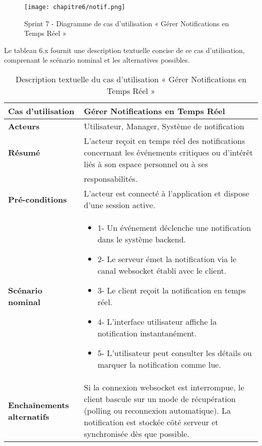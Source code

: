 \begin{figure}[H]
\centering
\texttt{[image: chapitre6/notif.png]}
\caption{Sprint 7 - Diagramme de cas d’utilisation « Gérer Notifications en Temps Réel »}
\end{figure}

Le tableau 6.x fournit une description textuelle concise de ce cas d’utilisation, comprenant le scénario nominal et les alternatives possibles.

\begin{longtable}{|>{\arraybackslash}p{4cm}|>{\arraybackslash}p{12cm}|}
\caption{\centering Description textuelle du cas d'utilisation « Gérer Notifications en Temps Réel »}
\label{tab:uc_notifications} \\
\hline
\rowcolor{gray!30}
\textbf{Cas d'utilisation} & Gérer Notifications en Temps Réel \\
\hline
\endfirsthead

\hline
\endhead

\hline
\endfoot

\hline \hline
\endlastfoot

\textbf{Acteurs} & Utilisateur, Manager, Système de notification \\
\hline
\textbf{Résumé} &
L’acteur reçoit en temps réel des notifications concernant les événements critiques ou d’intérêt liés à son espace personnel ou à ses  \\
\hline
\textbf{}&responsabilités.\\
\hline
\textbf{Pré-conditions} &
L’acteur est connecté à l’application et dispose d’une session active. \\
\hline
\textbf{Scénario nominal} &
\begin{itemize}[label=]
 \item{1-} Un événement déclenche une notification dans le système backend.
 \item{2-} Le serveur émet la notification via le canal websocket établi avec le client.
 \item{3-} Le client reçoit la notification en temps réel.
 \item{4-} L’interface utilisateur affiche la notification instantanément.
 \item{5-} L’utilisateur peut consulter les détails ou marquer la notification comme lue.
\end{itemize} \\
\hline
\textbf{Enchaînements alternatifs} &
Si la connexion websocket est interrompue, le client bascule sur un mode de récupération (polling ou reconnexion automatique). La notification est stockée côté serveur et synchronisée dès que possible. \\
\hline
\end{longtable}

